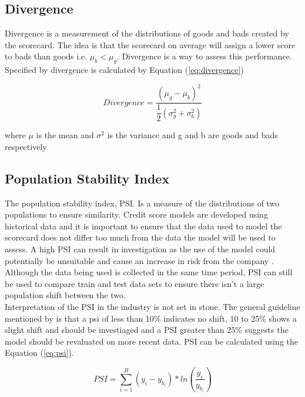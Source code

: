 \subsection*{Divergence}

Divergence is a measurement of the distributions of goods and bads created by the scorecard. The idea is that the scorecard on average will assign a lower score to bads than goods i.e. $\mu_{b} < \mu_{g}$. Divergence is a way to assess this performance. Specified by \parencite{bailey2004credit} divergence is calculated by Equation (\ref{eq:divergence})

\begin{equation}\label{eq:divergence}
Divergence = \dfrac{(\mu_g - \mu_b)^2}{\dfrac{1}{2} (\sigma_g^2 + \sigma_b^2)}
\end{equation}

where $\mu$ is the mean and $\sigma^2$ is the variance and g and b are goods and bads respectively

\subsection*{Population Stability Index}

The population stability index, PSI. Is a measure of the distributions of two populations to ensure similarity. Credit score models are developed using historical data and it is important to ensure that the data used to model the scorecard does not differ too much from the data the model will be used to assess. A high PSI can result in investigation as the use of the model could potentially be unsuitable and cause an increase in risk from the company \parencite{yurdakul2018statistical}. Although the data being used is collected in the same time period, PSI can still be used to compare train and test data sets to ensure there isn't a large population shift between the two.\\

Interpretation of the PSI in the industry is not set in stone. The general guideline mentioned by \parencite{bailey2004credit} is that a psi of less than 10\% indicates no shift, 10 to 25\% shows a slight shift and should be investiaged and a PSI greater than 25\% suggests the model should be revaluated on more recent data. PSI can be calculated using the Equation (\ref{eq:psi})\parencite{yurdakul2018statistical}.

\begin{equation}\label{eq:psi}
PSI = \sum_{i=1}^{B} (y_i-y_{b_i}) * ln(\dfrac{y_i}{y_{b_i}})
\end{equation}

